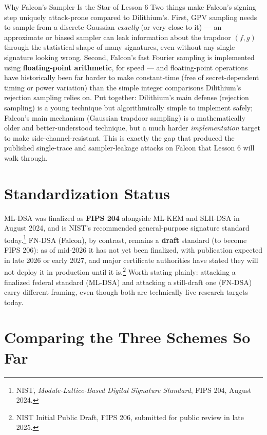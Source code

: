 \begin{previewbox}{Why Falcon's Sampler Is the Star of Lesson 6}
Two things make Falcon's signing step uniquely attack-prone compared to Dilithium's. First, GPV sampling needs to sample from a discrete Gaussian \emph{exactly} (or very close to it) --- an approximate or biased sampler can leak information about the trapdoor $(f,g)$ through the statistical shape of many signatures, even without any single signature looking wrong. Second, Falcon's fast Fourier sampling is implemented using \textbf{floating-point arithmetic}, for speed --- and floating-point operations have historically been far harder to make constant-time (free of secret-dependent timing or power variation) than the simple integer comparisons Dilithium's rejection sampling relies on. Put together: Dilithium's main defense (rejection sampling) is a young technique but algorithmically simple to implement safely; Falcon's main mechanism (Gaussian trapdoor sampling) is a mathematically older and better-understood technique, but a much harder \emph{implementation} target to make side-channel-resistant. This is exactly the gap that produced the published single-trace and sampler-leakage attacks on Falcon that Lesson 6 will walk through.
\end{previewbox}

\section{Standardization Status}
\label{sec:L4:standardization-status}

ML-DSA was finalized as \textbf{FIPS 204} alongside ML-KEM and SLH-DSA in August 2024, and is NIST's recommended general-purpose signature standard today.\footnote{NIST, \emph{Module-Lattice-Based Digital Signature Standard}, FIPS 204, August 2024.} FN-DSA (Falcon), by contrast, remains a \textbf{draft} standard (to become FIPS 206): as of mid-2026 it has not yet been finalized, with publication expected in late 2026 or early 2027, and major certificate authorities have stated they will not deploy it in production until it is.\footnote{NIST Initial Public Draft, FIPS 206, submitted for public review in late 2025.} Worth stating plainly: attacking a finalized federal standard (ML-DSA) and attacking a still-draft one (FN-DSA) carry different framing, even though both are technically live research targets today.

\section{Comparing the Three Schemes So Far}
\label{sec:L4:comparing-the-three-schemes-so-far}

